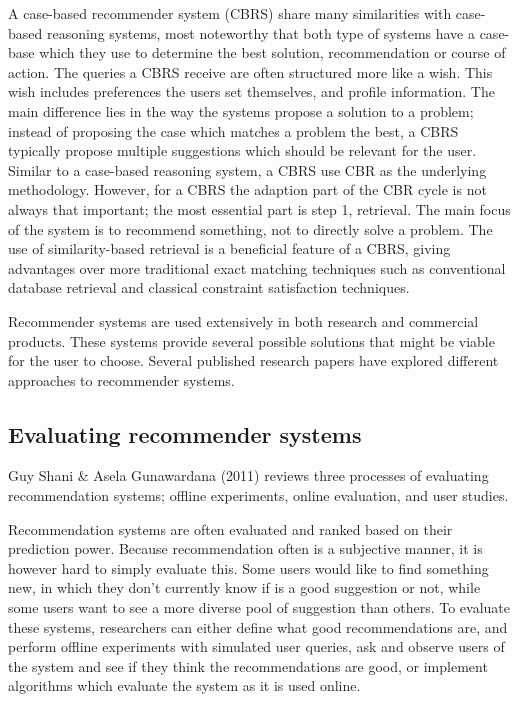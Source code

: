 A case-based recommender system (CBRS) share many similarities with case-based reasoning systems, most noteworthy that both type of systems have a case-base which they use to determine the best solution, recommendation or course of action. The queries a CBRS receive are often structured more like a wish.\cite{richter2013case} This wish includes preferences the users set themselves, and profile information. The main difference lies in the way the systems propose a solution to a problem; instead of proposing the case which matches a problem the best, a CBRS typically propose multiple suggestions which should be relevant for the user. Similar to a case-based reasoning system, a CBRS use CBR as the underlying methodology. However, for a CBRS the adaption part of the CBR cycle is not always that important; the most essential part is step 1, retrieval. The main focus of the system is to recommend something, not to directly solve a problem. The use of similarity-based retrieval is a beneficial feature of a CBRS, giving advantages over more traditional exact matching techniques such as conventional database retrieval and classical constraint satisfaction techniques\cite{bridge2005case}.

Recommender systems are used extensively in both research and commercial products. These systems provide several possible solutions that might be viable for the user to choose. Several published research papers have explored different approaches to recommender systems\cite{mulyana2015case}\cite{quijano2011happy}. 

\subsection{Evaluating recommender systems}

Guy Shani \& Asela Gunawardana (2011)\cite{shani2011evaluating} reviews three processes of evaluating recommendation systems; offline experiments, online evaluation, and user studies.

Recommendation systems are often evaluated and ranked based on their prediction power\cite{shani2011evaluating}. Because recommendation often is a subjective manner, it is however hard to simply evaluate this. Some users would like to find something new, in which they don't currently know if is a good suggestion or not, while some users want to see a more diverse pool of suggestion than others\cite{shani2011evaluating}. To evaluate these systems, researchers can either define what good recommendations are, and perform offline experiments with simulated user queries, ask and observe users of the system and see if they think the recommendations are good, or implement algorithms which evaluate the system as it is used online.

